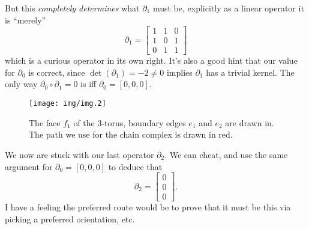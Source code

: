 But this \emph{completely determines} what $\partial_{1}$ must
be, explicitly as a linear operator it is ``merely''
\begin{equation}%
\partial_{1} = \begin{bmatrix}1 & 1 & 0\\
1 & 0 & 1\\
0 & 1 & 1\end{bmatrix}
\end{equation}
which is a curious operator in its own right. It's also a good
hint that our value for $\partial_{0}$ is correct, since
$\det(\partial_{1})=-2\neq0$ implies $\partial_{1}$ has a trivial
kernel. The only way $\partial_{0}\circ\partial_{1}=0$ is iff
$\partial_{0}=[0,0,0]$.

\begin{figure}[t]
\begin{center}
\texttt{[image: img/img.2]}
\end{center}
\caption{The face $f_{1}$ of the 3-torus, boundary edges $e_{1}$
  and $e_{2}$ are drawn in. The path we use for the chain complex
  is drawn in red.}\label{fig:img2}
\end{figure}

We now are stuck with our last operator $\partial_{2}$. We can
cheat, and use the same argument for $\partial_{0}=[0,0,0]$
to deduce that
\begin{equation}%
\partial_{2} = \begin{bmatrix}0\\0\\0\end{bmatrix}.
\end{equation}
I have a feeling the preferred route would be to prove that it
must be this via picking a preferred orientation, etc.
